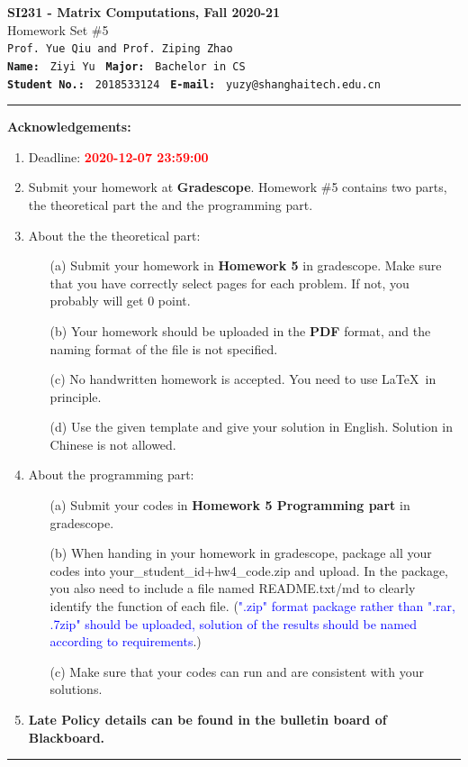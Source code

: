 \documentclass[english,onecolumn]{IEEEtran}
\begin{document}
\begin{center}
	\textbf{\LARGE{SI231 - Matrix Computations, Fall 2020-21}}\\
	{\Large Homework Set \#5}\\
	\texttt{Prof. Yue Qiu and Prof. Ziping Zhao}\\
	\texttt{\textbf{Name:}}   	\texttt{ Ziyi Yu }  		\hspace{1bp}
	\texttt{\textbf{Major:}}  	\texttt{ Bachelor in CS } 	\\
	\texttt{\textbf{Student No.:}} 	\texttt{ 2018533124 }     \hspace{1bp}
	\texttt{\textbf{E-mail:}} 	\texttt{ yuzy@shanghaitech.edu.cn}
\par\end{center}

\noindent
\rule{\linewidth}{0.4pt}
{\bf {\large Acknowledgements:}}
\begin{enumerate}
    \item Deadline: \textcolor{red}{\textbf{2020-12-07 23:59:00}}
    \item Submit your homework at \textbf{Gradescope}.
    Homework \#5 contains two parts, the theoretical part the and the programming part.
    \item About the the theoretical part:
    \begin{enumerate}
            \item[(a)] Submit your homework in \textbf{Homework 5} in gradescope. Make sure that you have correctly select pages for each problem. If not, you probably will get 0 point.
            \item[(b)] Your homework should be uploaded in the \textbf{PDF} format, and the naming format of the file is not specified.
            \item[(c)] No handwritten homework is accepted. You need to use \LaTeX $\,$ in principle.
            \item[(d)] Use the given template and give your solution in English. Solution in Chinese is not allowed. 
        \end{enumerate}
  \item About the programming part:
  \begin{enumerate}
      \item[(a)] Submit your codes in \textbf{Homework 5 Programming part} in gradescope. 
      \item[(b)] When handing in your homework in gradescope, package all your codes into {\sf your\_student\_id+hw4\_code.zip} and upload. In the package, you also need to include a file named {\sf README.txt/md} to clearly identify the function of each file. (\textcolor{blue}{".zip" format package rather than ".rar, .7zip" should be uploaded, solution of the results should be named according to requirements}.)
     \item[(c)] Make sure that your codes can run and are consistent with your solutions.
  \end{enumerate}
  \item \textbf{Late Policy details can be found in the bulletin board of Blackboard.}
\end{enumerate}
\rule{\linewidth}{0.4pt}
\end{document}
